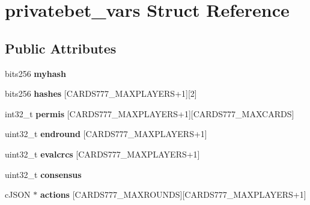 \hypertarget{structprivatebet__vars}{}\section{privatebet\+\_\+vars Struct Reference}
\label{structprivatebet__vars}
\subsection*{Public Attributes}
\begin{DoxyCompactItemize}
\item 
\mbox{\label{structprivatebet__vars_a3d1f69a4d06de80930cd37e647deb1e9}} 
bits256 {\bfseries myhash}
\item 
\mbox{\label{structprivatebet__vars_a66da046d580bae150ab99dd6a5ac3b55}} 
bits256 {\bfseries hashes} \mbox{[}C\+A\+R\+D\+S777\+\_\+\+M\+A\+X\+P\+L\+A\+Y\+E\+RS+1\mbox{]}\mbox{[}2\mbox{]}
\item 
\mbox{\label{structprivatebet__vars_af2d141af405be918e44dd233bb2c28ce}} 
int32\+\_\+t {\bfseries permis} \mbox{[}C\+A\+R\+D\+S777\+\_\+\+M\+A\+X\+P\+L\+A\+Y\+E\+RS+1\mbox{]}\mbox{[}C\+A\+R\+D\+S777\+\_\+\+M\+A\+X\+C\+A\+R\+DS\mbox{]}
\item 
\mbox{\label{structprivatebet__vars_a1024da5f14f9d2a5feea553160943bc9}} 
uint32\+\_\+t {\bfseries endround} \mbox{[}C\+A\+R\+D\+S777\+\_\+\+M\+A\+X\+P\+L\+A\+Y\+E\+RS+1\mbox{]}
\item 
\mbox{\label{structprivatebet__vars_a47a408e1bf5e3ac50fb9321a6f00332d}} 
uint32\+\_\+t {\bfseries evalcrcs} \mbox{[}C\+A\+R\+D\+S777\+\_\+\+M\+A\+X\+P\+L\+A\+Y\+E\+RS+1\mbox{]}
\item 
\mbox{\label{structprivatebet__vars_a4bd5b696098a9133c7d7f6b601c1e061}} 
uint32\+\_\+t {\bfseries consensus}
\item 
\mbox{\label{structprivatebet__vars_a9cc412a623fde59fcd173ca97b504cde}} 
c\+J\+S\+ON $\ast$ {\bfseries actions} \mbox{[}C\+A\+R\+D\+S777\+\_\+\+M\+A\+X\+R\+O\+U\+N\+DS\mbox{]}\mbox{[}C\+A\+R\+D\+S777\+\_\+\+M\+A\+X\+P\+L\+A\+Y\+E\+RS+1\mbox{]}

\end{DoxyCompactItemize}
